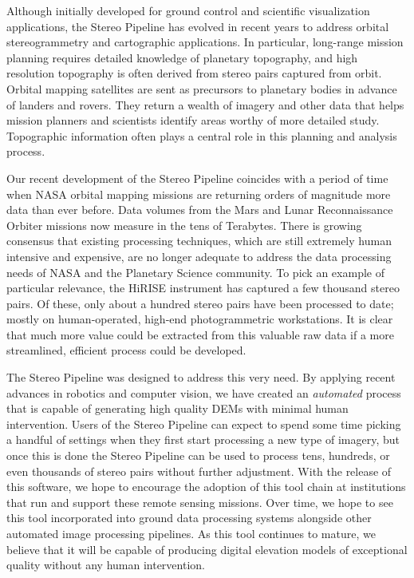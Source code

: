 Although initially developed for ground control and scientific
visualization applications, the Stereo Pipeline has evolved in recent
years to address orbital stereogrammetry and cartographic
applications.  In particular, long-range mission planning requires
detailed knowledge of planetary topography, and high resolution
topography is often derived from stereo pairs captured from orbit.
Orbital mapping satellites are sent as precursors to planetary bodies
in advance of landers and rovers.  They return a wealth of imagery and
other data that helps mission planners and scientists identify areas
worthy of more detailed study. Topographic information often plays a
central role in this planning and analysis process.

Our recent development of the Stereo Pipeline coincides with a
period of time when \ac{NASA} orbital mapping missions are returning
orders of magnitude more data than ever before.  Data volumes from
the Mars and Lunar Reconnaissance Orbiter missions now measure in
the tens of Terabytes.  There is growing consensus that existing
processing techniques, which are still extremely human intensive
and expensive, are no longer adequate to address the data processing
needs of \ac{NASA} and the Planetary Science community.  To pick
an example of particular relevance, the \ac{HiRISE} instrument has
captured a few thousand stereo pairs.
Of these, only about a hundred stereo pairs have been processed to
date; mostly on human-operated, high-end photogrammetric workstations.
It is clear that much more value could be extracted from this
valuable raw data if a more streamlined, efficient process could be
developed.

The Stereo Pipeline was designed to address this very need.  By
applying recent advances in robotics and computer vision, we have
created an {\em automated} process that is capable of generating high
quality \acp{DEM} with minimal human intervention.  Users of the Stereo
Pipeline can expect to spend some time picking a handful of settings
when they first start processing a new type of imagery, but once this
is done the Stereo Pipeline can be used to process tens, hundreds, or
even thousands of stereo pairs without further adjustment.  With the
release of this software, we hope to encourage the adoption of this
tool chain at institutions that run and support these remote sensing
missions.  Over time, we hope to see this tool incorporated into
ground data processing systems alongside other automated image
processing pipelines.  As this tool continues to mature, we believe
that it will be capable of producing digital elevation models of
exceptional quality without any human intervention.

